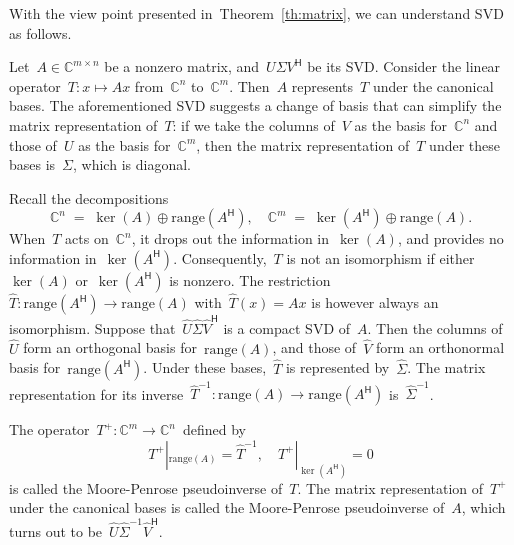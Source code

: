 \documentclass[11pt,a4paper]{article}  %
\numberwithin{equation}{section}
\theoremstyle{definition}
\def\CC{\mathbb{C}}
\newcommand{\hmt}{{\scriptscriptstyle{{\mathsf{H}}}}}
\newcommand{\pin}{{\scriptscriptstyle{{\mathsf{+}}}}}
\newcommand{\inv}{{-1}}
\newcommand{\range}{\mathrm{range}}
\begin{document}
With the view point presented in~Theorem~\ref{th:matrix}, we can understand SVD as follows.

Let~$A\in \CC^{m\times n}$ be a nonzero matrix, and~$U\Sigma V^\hmt$ be its SVD.
Consider the linear operator~$T \mathrel{:} x \mapsto A x$ from~$\CC^{n}$ to~$\CC^{m}$.
Then~$A$ represents~$T$ under the canonical bases.
The aforementioned SVD suggests a change of basis that can simplify the matrix representation of~$T$:
if we take the columns of~$V$ as the basis for~$\CC^{n}$ and those of~$U$ as the basis for~$\CC^{m}$,
then the matrix representation of~$T$ under these bases is~$\Sigma$, which is diagonal.


Recall the decompositions
\begin{equation*}
\CC^{n} \;=\; \ker(A) \oplus \range(A^\hmt),
\quad
\CC^{m} \;=\; \ker(A^\hmt) \oplus \range(A).
\end{equation*}
When~$T$ acts on~$\CC^{n}$, it drops out the information in~$\ker(A)$, and provides no information
in~$\ker(A^\hmt)$.  Consequently,~$T$ is not an isomorphism if either~$\ker(A)$ or~$\ker(A^\hmt)$
is nonzero.
The restriction~$\hat{T} \mathrel{:} \range(A^\hmt)\to\range(A)$ with~$\hat{T} (x) =Ax$ is however
always an isomorphism.
Suppose that~$\hat{U}\hat{\Sigma} \hat{V}^\hmt$ is a compact SVD of~$A$.
Then the columns of~$\hat{U}$ form an orthogonal basis
for~$\range(A)$, and those of~$\hat{V}$ form an orthonormal basis for~$\range(A^\hmt)$.
Under these bases,~$\hat{T}$ is represented by~$\hat{\Sigma}$.
The matrix representation for its inverse~$\hat{T}^\inv\mathrel{:} \range(A)\to \range(A^\hmt)$
is~$\hat{\Sigma}^\inv$.

The operator~$T^\pin \mathrel{:} \CC^{m}\to \CC^{n}$~defined by%
\[
T^\pin|_{\range(A)} = \hat{T}^\inv, \quad
T^\pin|_{\ker(A^\hmt)} = 0
\]
is called the Moore-Penrose pseudoinverse of~$T$.
The matrix representation
of~$T^\pin$ under the canonical bases is called the Moore-Penrose pseudoinverse of~$A$, which
turns out to be~$\hat{U}\hat{\Sigma}^\inv\hat{V}^\hmt$.
\end{document}
